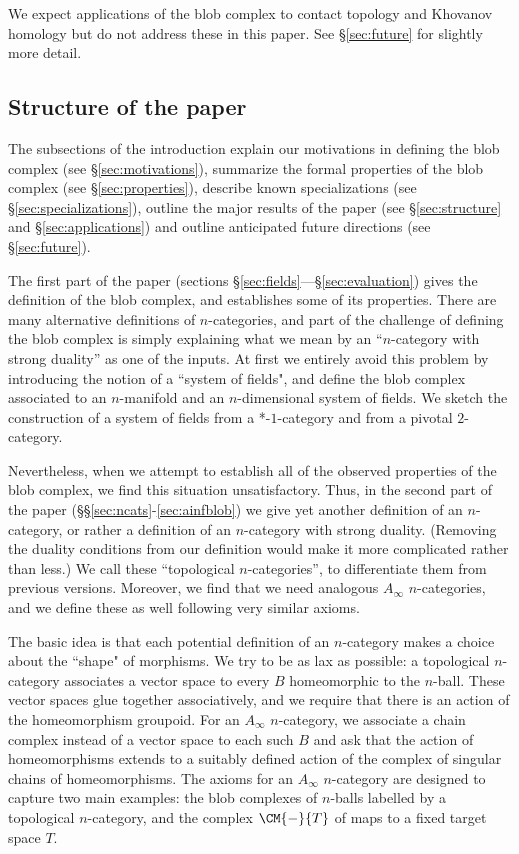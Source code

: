 We expect applications of the blob complex to contact topology and Khovanov homology 
but do not address these in this paper.
See \S \ref{sec:future} for slightly more detail.


\subsection{Structure of the paper}
The subsections of the introduction explain our motivations in defining the blob complex (see \S \ref{sec:motivations}), 
summarize the formal properties of the blob complex (see \S \ref{sec:properties}), describe known specializations (see \S \ref{sec:specializations}), outline the major results of the paper (see \S \ref{sec:structure} and \S \ref{sec:applications})
and outline anticipated future directions (see \S \ref{sec:future}).

The first part of the paper (sections \S \ref{sec:fields}---\S \ref{sec:evaluation}) gives the definition of the blob complex, 
and establishes some of its properties.
There are many alternative definitions of $n$-categories, and part of the challenge of defining the blob complex is 
simply explaining what we mean by an ``$n$-category with strong duality'' as one of the inputs.
At first we entirely avoid this problem by introducing the notion of a ``system of fields", and define the blob complex 
associated to an $n$-manifold and an $n$-dimensional system of fields.
We sketch the construction of a system of fields from a *-$1$-category and from a pivotal $2$-category.

Nevertheless, when we attempt to establish all of the observed properties of the blob complex, 
we find this situation unsatisfactory.
Thus, in the second part of the paper (\S\S \ref{sec:ncats}-\ref{sec:ainfblob}) we give yet another 
definition of an $n$-category, or rather a definition of an $n$-category with strong duality.
(Removing the duality conditions from our definition would make it more complicated rather than less.) 
We call these ``topological $n$-categories'', to differentiate them from previous versions.
Moreover, we find that we need analogous $A_\infty$ $n$-categories, and we define these as well following very similar axioms.

The basic idea is that each potential definition of an $n$-category makes a choice about the ``shape" of morphisms.
We try to be as lax as possible: a topological $n$-category associates a vector space to every $B$ homeomorphic to the $n$-ball.
These vector spaces glue together associatively, and we require that there is an action of the homeomorphism groupoid.
For an $A_\infty$ $n$-category, we associate a chain complex instead of a vector space to each such $B$ and ask that the action of 
homeomorphisms extends to a suitably defined action of the complex of singular chains of homeomorphisms.
The axioms for an $A_\infty$ $n$-category are designed to capture two main examples: the blob complexes of $n$-balls labelled by a 
topological $n$-category, and the complex $\CM{-}{T}$ of maps to a fixed target space $T$.

